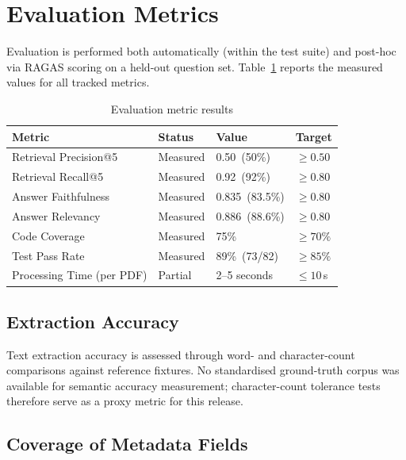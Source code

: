 \documentclass[12pt,a4paper]{report}
\begin{document}
\section{Evaluation Metrics}

Evaluation is performed both automatically (within the test suite) and post-hoc
via RAGAS scoring on a held-out question set.
Table~\ref{tab:metrics} reports the measured values for all tracked metrics.

\begin{table}[ht]
\centering
\caption{Evaluation metric results}
\label{tab:metrics}
\begin{tabular}{llll}
\toprule
\textbf{Metric} & \textbf{Status} & \textbf{Value} & \textbf{Target} \\
\midrule
Retrieval Precision@5     & Measured & 0.50\ (50\%)    & $\geq 0.50$ \\
Retrieval Recall@5        & Measured & 0.92\ (92\%)    & $\geq 0.80$ \\
Answer Faithfulness       & Measured & 0.835\ (83.5\%) & $\geq 0.80$ \\
Answer Relevancy          & Measured & 0.886\ (88.6\%) & $\geq 0.80$ \\
Code Coverage             & Measured & 75\%            & $\geq 70\%$ \\
Test Pass Rate            & Measured & 89\%\ (73/82)   & $\geq 85\%$ \\
Processing Time (per PDF) & Partial  & 2--5 seconds    & $\leq 10$\,s \\
\bottomrule
\end{tabular}
\end{table}

\subsection{Extraction Accuracy}

Text extraction accuracy is assessed through word- and character-count
comparisons against reference fixtures. No standardised ground-truth corpus was
available for semantic accuracy measurement; character-count tolerance tests
therefore serve as a proxy metric for this release.

\subsection{Coverage of Metadata Fields}
\end{document}
